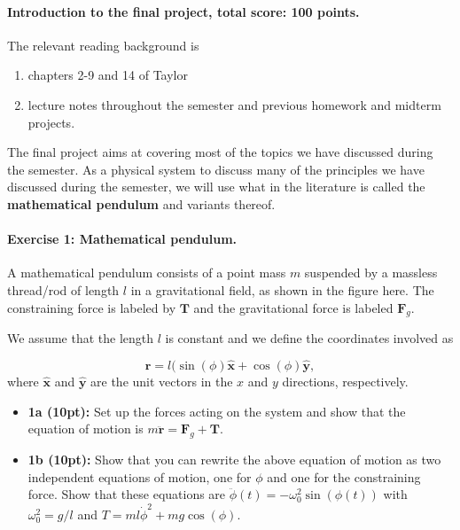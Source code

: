 \documentclass[%
oneside,                 %
final,                   %
10pt]{article}
\begin{document}
\noindent
\paragraph{Introduction to the final project, total score: 100  points.}
The relevant reading background is
\begin{enumerate}
\item chapters 2-9 and 14 of Taylor

\item lecture notes throughout the semester and previous homework and midterm projects.
\end{enumerate}

\noindent
The final project aims at covering most of the topics we have discussed during the semester. As a physical system to discuss many of the principles we have discussed during the semester, we will use what in the literature is called the \textbf{mathematical pendulum} and variants thereof. 

\paragraph{Exercise 1: Mathematical pendulum.}
A mathematical pendulum consists of a point mass $m$ suspended by a massless thread/rod of length $l$ in a gravitational field, as shown in the figure here. The constraining force is labeled by $\bm{T}$
and the gravitational force is labeled $\bm{F}_g$.


We assume that the length $l$ is constant and we define the coordinates involved as

\[
\bm{r} = l(\sin(\phi)\bm{\hat{x}}+\cos(\phi)\bm{\hat{y}},
\]
where $\bm{\hat{x}}$ and $\bm{\hat{y}}$ are the unit vectors in the $x$ and $y$ directions, respectively.

\begin{itemize}
\item \textbf{1a (10pt):} Set up the forces acting on the system and show that the equation of motion is $m\ddot{\bm{r}}=\bm{F}_g+\bm{T}$.

\item \textbf{1b (10pt):} Show that you can rewrite the above equation of motion as two independent equations of motion, one for $\phi$ and one for the constraining force. Show that these equations are $\ddot{\phi}(t)=-\omega_0^2\sin{(\phi(t))}$ with $\omega_0^2=g/l$ and $T=ml\dot{\phi}^2+mg\cos{(\phi)}$.
\end{itemize}
\end{document}
